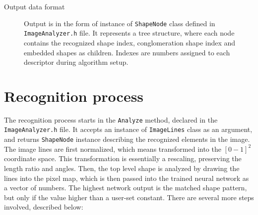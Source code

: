 \begin{description}
\item [Output data format]
Output is in the form of instance of \texttt{ShapeNode} class defined in \texttt{ImageAnalyzer.h} file. It represents a tree structure, where each node contains the recognized shape index, conglomeration shape index and embedded shapes as children. Indexes are numbers assigned to each descriptor during algorithm setup.   

\end{description}

\section{Recognition process}
The recognition process starts in the \texttt{Analyze} method, declared in the \texttt{ImageAnalyzer.h} file. It accepts an instance of \texttt{ImageLines} class as an argument, and returns \texttt{ShapeNode} instance describing the recognized elements in the image. The image lines are first normalized, which means transformed into the $[0-1]^2$ coordinate space. This transformation is essentially a rescaling, preserving the length ratio and angles. Then, the top level shape is analyzed by drawing the lines into the pixel map, which is then passed into the trained neural network as a vector of numbers. The highest network output is the matched shape pattern, but only if the value higher than a user-set constant. There are several more steps involved, described below:

